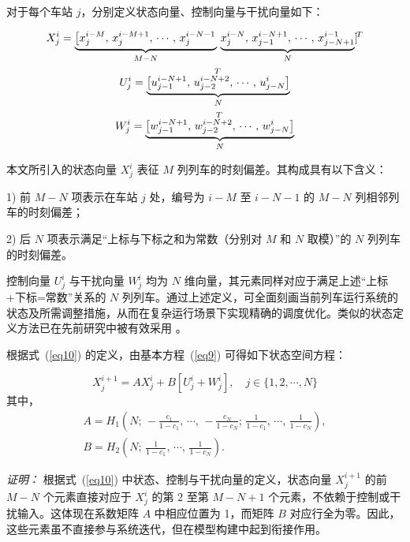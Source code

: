 对于每个车站 $j$，分别定义状态向量、控制向量与干扰向量如下：

\begin{gather}
	X_{j}^{i}=\underbrace{\left[x_{j}^{i-M},\, x_{j}^{i-M+1},\, \cdots,\, x_{j}^{i-N-1}\right.}_{M-N}\,
	\underbrace{x_{j}^{i-N},\, x_{j-1}^{i-N+1},\, \cdots,\, x_{j-N+1}^{i-1}}_{N}]^{\!T} \notag \\ 
	U_{j}^{i}=\underbrace{\left[u_{j-1}^{i-N+1},\, u_{j-2}^{i-N+2},\, \cdots,\, u_{j-N}^{i}\right]}_{N}^{\!T} \notag \\ 
	W_{j}^{i}=\underbrace{\left[w_{j-1}^{i-N+1},\, w_{j-2}^{i-N+2},\, \cdots,\, w_{j-N}^{i}\right]}_{N}^{\!T}
	\label{eq10}
\end{gather}

本文所引入的状态向量 $X_j^i$ 表征 $M$ 列列车的时刻偏差。其构成具有以下含义：

1) 前 $M-N$ 项表示在车站 $j$ 处，编号为 $i-M$ 至 $i-N-1$ 的 $M-N$ 列相邻列车的时刻偏差；

2) 后 $N$ 项表示满足“上标与下标之和为常数（分别对 $M$ 和 $N$ 取模）”的 $N$ 列列车的时刻偏差。

控制向量 $U_j^i$ 与干扰向量 $W_j^i$ 均为 $N$ 维向量，其元素同样对应于满足上述“上标+下标=常数”关系的 $N$ 列列车。通过上述定义，可全面刻画当前列车运行系统的状态及所需调整措施，从而在复杂运行场景下实现精确的调度优化。类似的状态定义方法已在先前研究中被有效采用 \cite{Moaveni2018, Khosrosereshki2021}。

根据式~(\ref{eq10}) 的定义，由基本方程~(\ref{eq9}) 可得如下状态空间方程：

\begin{equation} 
	X_{j}^{i+1}=A X_{j}^{i}+B\left[U_{j}^{i}+W_{j}^{i}\right], \quad j \in\{1,2, \cdots, N\}
	\label{eq11}
\end{equation}
其中，
\begin{equation*}
	\begin{gathered}
		A=H_1\!\left(N;\, -\frac{c_1}{1-c_1},\, \cdots,\, -\frac{c_N}{1-c_N};\,
		\frac{1}{1-c_1},\, \cdots,\, \frac{1}{1-c_N}\right), \\
		B=H_2\!\left(N;\, \frac{1}{1-c_1},\, \cdots,\, \frac{1}{1-c_N}\right).
	\end{gathered}
\end{equation*}

\noindent\textit{证明：}  
根据式~(\ref{eq10}) 中状态、控制与干扰向量的定义，状态向量 $X_j^{i+1}$ 的前 $M-N$ 个元素直接对应于 $X_j^i$ 的第 $2$ 至第 $M-N+1$ 个元素，不依赖于控制或干扰输入。这体现在系数矩阵 $A$ 中相应位置为 1，而矩阵 $B$ 对应行全为零。因此，这些元素虽不直接参与系统迭代，但在模型构建中起到衔接作用。

